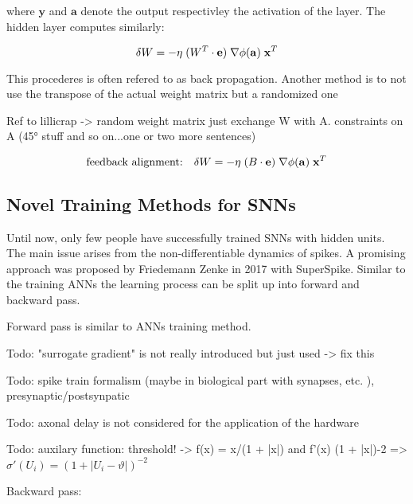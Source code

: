where $\mathbf{y}$ and $\mathbf{a}$ denote the output respectivley the activation of the layer. The hidden layer computes similarly:

\begin{equation}
\delta W = - \eta \;
(W^T \cdot \mathbf{e}) \;
\nabla \phi(\mathbf{a}) \;
\mathbf{x}^T\\
\end{equation}

This procederes is often refered to as back propagation. Another method is to not use the transpose of the actual weight matrix but a randomized one 

Ref to lillicrap -> random weight matrix just exchange W with A. constraints on A (45° stuff and so on...one or two more sentences)

\begin{equation}
\text{feedback alignment:} \quad \delta W = - \eta \;
(B \cdot \mathbf{e}) \;
\nabla \phi(\mathbf{a}) \;
\mathbf{x}^T\;\\
\end{equation}

\subsection{Novel Training Methods for SNNs}

Until now, only few people have successfully trained SNNs with hidden units. The main issue arises from the non-differentiable dynamics of spikes. A promising approach was proposed by Friedemann Zenke in 2017 with SuperSpike. Similar to the training ANNs the learning process can be split up into forward and backward pass. 

Forward pass is similar to ANNs training method.

Todo: "surrogate gradient" is not really introduced but just used -> fix this

Todo: spike train formalism (maybe in biological part with synapses, etc. ), presynaptic/postsynpatic 

Todo: axonal delay is not considered for the application of the hardware

Todo: auxilary function: threshold! -> f(x) = x/(1 + |x|) and f'(x) (1 + |x|)-2 => $\sigma'(U_i) = (1+|U_i - \vartheta|)^{-2}$

Backward pass:

